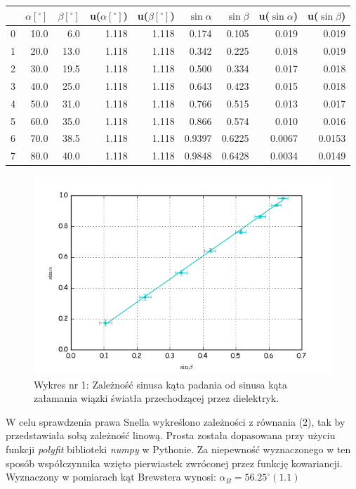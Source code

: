 \documentclass[a4paper,10pt]{article}
\begin{document}
\begin{tabular}{lrrrrrrrr}
\toprule
\hline
{}&$\alpha[^\circ]$&$\beta[^\circ]$&u($\alpha[^\circ]$)&u($\beta[^\circ]$)&$\sin{\alpha}$&$\sin{\beta}$&u($\sin{\alpha}$)&u($\sin{\beta}$) \\
\midrule
\hline
0 & 10.0 &  6.0 & 1.118 & 1.118 & 0.174 & 0.105 & 0.019 & 0.019 \\
1 & 20.0 & 13.0 & 1.118 & 1.118 & 0.342 & 0.225 & 0.018 & 0.019 \\
2 & 30.0 & 19.5 & 1.118 & 1.118 & 0.500 & 0.334 & 0.017 & 0.018 \\
3 & 40.0 & 25.0 & 1.118 & 1.118 & 0.643 & 0.423 & 0.015 & 0.018 \\
4 & 50.0 & 31.0 & 1.118 & 1.118 & 0.766 & 0.515 & 0.013 & 0.017 \\
5 & 60.0 & 35.0 & 1.118 & 1.118 & 0.866 & 0.574 & 0.010 & 0.016 \\
6 & 70.0 & 38.5 & 1.118 & 1.118 & 0.9397 & 0.6225 & 0.0067 & 0.0153 \\
7 & 80.0 & 40.0 & 1.118 & 1.118 & 0.9848 & 0.6428 & 0.0034 & 0.0149 \\
\hline
\bottomrule
\end{tabular}

\begin{figure}[H]
  \includegraphics{./snella.png}
  \caption{Wykres nr 1: Zależność sinusa kąta padania od sinusa kąta załamania wiązki światła przechodzącej przez dielektryk.}
\end{figure}
W celu sprawdzenia prawa Snella wykreślono zależności z równania (2), tak by przedstawiała sobą zależność linową. Prosta została dopasowana
przy użyciu funkcji \emph{polyfit} biblioteki \emph{numpy} w Pythonie. Za niepewność wyznaczonego w ten sposób współczynnika wzięto pierwiastek zwróconej
przez funkcję kowariancji.
\\Wyznaczony w pomiarach kąt Brewstera wynosi: $\alpha_B = 56.25^\circ(1.1)$
\end{document}
